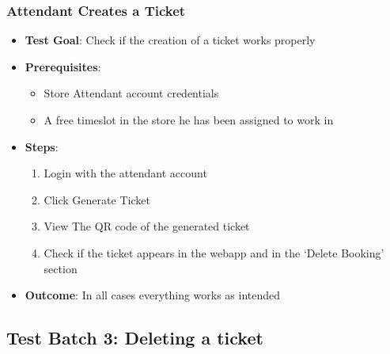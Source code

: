 \subsubsection{Attendant Creates a Ticket}
\begin{itemize}
    \item \textbf{Test Goal}: Check if the creation of a ticket works properly
    \item \textbf{Prerequisites}:
          \begin{itemize}
              \item Store Attendant account credentials
              \item A free timeslot in the store he has been assigned to work in
          \end{itemize}
    \item \textbf{Steps}:
          \begin{enumerate}
              \item Login with the attendant account
              \item Click Generate Ticket
              \item View The QR code of the generated ticket
              \item Check if the ticket appears in the webapp and in the `Delete Booking' section
          \end{enumerate}
    \item \textbf{Outcome}: In all cases everything works as intended
\end{itemize}

\clearpage

\subsection{Test Batch 3: Deleting a ticket}
